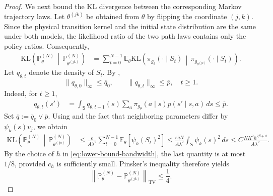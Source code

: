 \documentclass{article}
\theoremstyle{definition}
\theoremstyle{remark}
\theoremstyle{plain}
\newcommand{\KL}{\mathrm{KL}}
\numberwithin{equation}{section}
\begin{document}
\begin{proof}
We next bound the \(\KL\) divergence between the corresponding Markov trajectory laws.
Let \(\theta^{(jk)}\) be obtained from \(\theta\) by flipping the
coordinate \((j,k)\). Since the physical transition kernel and the
initial state distribution are the same under both models, the
likelihood ratio of the two path laws contains only the policy ratios.
Consequently,
\begin{align}
\label{eq:pathwise-KL-chain-rule}
    \KL\left(
        \mathbb P_\theta^{(N)}
        \,\middle|\,
        \mathbb P_{\theta^{(jk)}}^{(N)}
    \right)
    &=
    \sum_{t=0}^{N-1}
    \mathbb E_\theta
    \KL\left(
        \pi_{g_\theta}(\cdot\mid S_t)
        \,\middle|\,
        \pi_{g_{\theta^{(jk)}}}(\cdot\mid S_t)
    \right).
\end{align}
Let \(q_{\theta,t}\) denote the density of \(S_t\). By
,
\[
    \|q_{\theta,0}\|_\infty\leq\overline q_0,
    \qquad
    \|q_{\theta,t}\|_\infty\leq\overline p,
    \quad t\geq1.
\]
Indeed, for \(t\geq1\),
\[
\begin{aligned}
    q_{\theta,t}(s')
    &=
    \int_{\mathsf S}
    q_{\theta,t-1}(s)
    \sum_a
    \pi_{g_\theta}(a\mid s)
    p(s'\mid s,a)\,ds
   \leq
    \overline p.
\end{aligned}
\]
Set \(\overline q
    :=
    \overline q_0\vee\overline p.\)
Using  and the fact that
neighboring parameters differ by
\(\psi_k(s)v_j\), we obtain
\begin{align}
\label{eq:pathwise-neighbor-KL}
    \KL\left(
        \mathbb P_\theta^{(N)}
        \,\middle|\,
        \mathbb P_{\theta^{(jk)}}^{(N)}
    \right)
    &\leq
    \frac{e}{A\lambda^2}
    \sum_{t=0}^{N-1}
    \mathbb E_\theta[\psi_k(S_t)^2]
    \leq
    \frac{
        e\overline qN
    }{
        A\lambda^2
    }
    \int_{\mathsf S}\psi_k(s)^2\,ds
    \leq
    C
    \frac{
        NK^2h^{2\beta+d}
    }{
        A\lambda^2
    }.
    \nonumber
\end{align}
By the choice of \(h\) in \eqref{eq:lower-bound-bandwidth}, the last
quantity is at most \(1/8\), provided \(c_h\) is sufficiently small.
Pinsker's inequality therefore yields
\begin{equation}
\label{eq:neighbor-TV}
    \left\|
        \mathbb P_\theta^{(N)}
        -
        \mathbb P_{\theta^{(jk)}}^{(N)}
    \right\|_{\mathrm{TV}}
    \leq
    \frac14.
\end{equation}


\end{proof}
\end{document}
